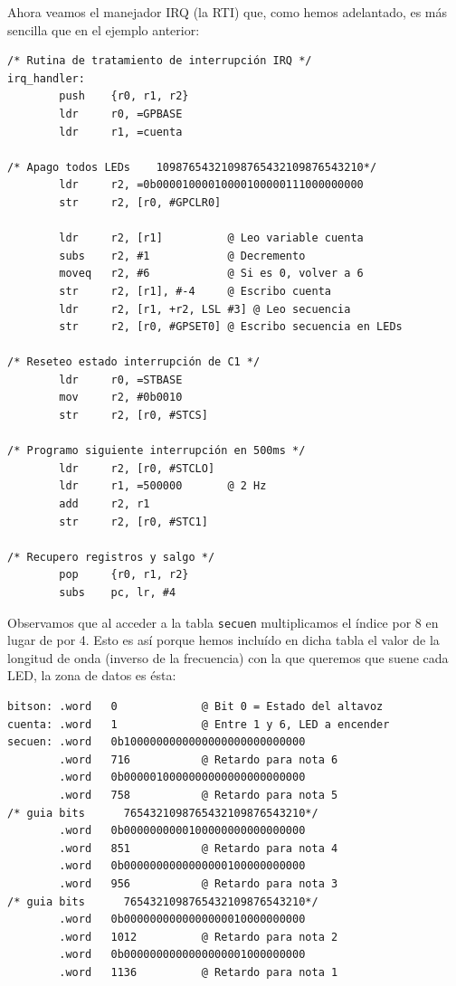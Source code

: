Ahora veamos el manejador IRQ (la RTI) que, como hemos adelantado, es más sencilla que en el
ejemplo anterior:

\begin{lstlisting}
/* Rutina de tratamiento de interrupción IRQ */
irq_handler:
        push    {r0, r1, r2}
        ldr     r0, =GPBASE
        ldr     r1, =cuenta

/* Apago todos LEDs    10987654321098765432109876543210*/
        ldr     r2, =0b00001000010000100000111000000000
        str     r2, [r0, #GPCLR0]

        ldr     r2, [r1]          @ Leo variable cuenta
        subs    r2, #1            @ Decremento
        moveq   r2, #6            @ Si es 0, volver a 6
        str     r2, [r1], #-4     @ Escribo cuenta
        ldr     r2, [r1, +r2, LSL #3] @ Leo secuencia
        str     r2, [r0, #GPSET0] @ Escribo secuencia en LEDs

/* Reseteo estado interrupción de C1 */
        ldr     r0, =STBASE
        mov     r2, #0b0010
        str     r2, [r0, #STCS]

/* Programo siguiente interrupción en 500ms */
        ldr     r2, [r0, #STCLO]
        ldr     r1, =500000       @ 2 Hz
        add     r2, r1
        str     r2, [r0, #STC1]

/* Recupero registros y salgo */
        pop     {r0, r1, r2}
        subs    pc, lr, #4
\end{lstlisting}

Observamos que al acceder a la tabla {\tt secuen} multiplicamos el índice por 8 en lugar de
por 4. Esto es así porque hemos incluído en dicha tabla el valor de la longitud de onda (inverso
de la frecuencia) con la que queremos que suene cada LED, la zona de datos es ésta:

\begin{lstlisting}
bitson: .word   0             @ Bit 0 = Estado del altavoz
cuenta: .word   1             @ Entre 1 y 6, LED a encender
secuen: .word   0b1000000000000000000000000000
        .word   716           @ Retardo para nota 6
        .word   0b0000010000000000000000000000
        .word   758           @ Retardo para nota 5
/* guia bits      7654321098765432109876543210*/
        .word   0b0000000000100000000000000000
        .word   851           @ Retardo para nota 4
        .word   0b0000000000000000100000000000
        .word   956           @ Retardo para nota 3
/* guia bits      7654321098765432109876543210*/
        .word   0b0000000000000000010000000000
        .word   1012          @ Retardo para nota 2
        .word   0b0000000000000000001000000000
        .word   1136          @ Retardo para nota 1
\end{lstlisting}

